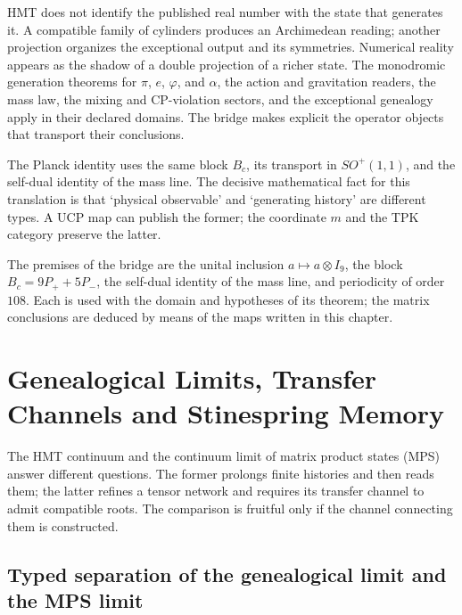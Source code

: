 HMT does not identify the published real number with the state that generates it. A
compatible family of cylinders produces an Archimedean reading; another
projection organizes the exceptional output and its symmetries. Numerical
reality appears as the shadow of a double projection of a richer state.
The monodromic generation theorems for $\pi$, $e$, $\varphi$, and $\alpha$,
the action and
gravitation readers, the mass law, the mixing and CP-violation sectors, and the
exceptional genealogy apply in their declared domains. The bridge makes
explicit the operator objects that transport their conclusions.

The Planck identity uses the same block $B_c$, its
transport in $SO^+(1,1)$, and the self-dual identity of the mass line. The
decisive mathematical fact for this translation is that ‘physical observable’ and
‘generating history’ are different types. A UCP map can publish
the former; the coordinate $m$ and the TPK category preserve the latter.

\begin{sourcebox}
The premises of the bridge are the unital inclusion
$a\mapsto a\otimes I_9$, the block $B_c=9P_++5P_-$, the self-dual identity of
the mass line, and periodicity of order \(108\). Each is used with
the domain and hypotheses of its theorem; the matrix conclusions are
deduced by means of the maps written in this chapter.
\end{sourcebox}


\ifdefined\HMTGMCContinuumMPS
\section{Genealogical Limits, Transfer Channels and Stinespring Memory}
\label{p12-83-c22-s7:gmc:chap:continuo-mps}

The HMT continuum and the continuum limit of matrix product states (MPS)
answer different questions. The former prolongs finite histories and
then reads them; the latter refines a tensor network and requires its transfer
channel to admit compatible roots. The comparison is fruitful only if
the channel connecting them is constructed.

\subsection{Typed separation of the genealogical limit and the MPS limit}

